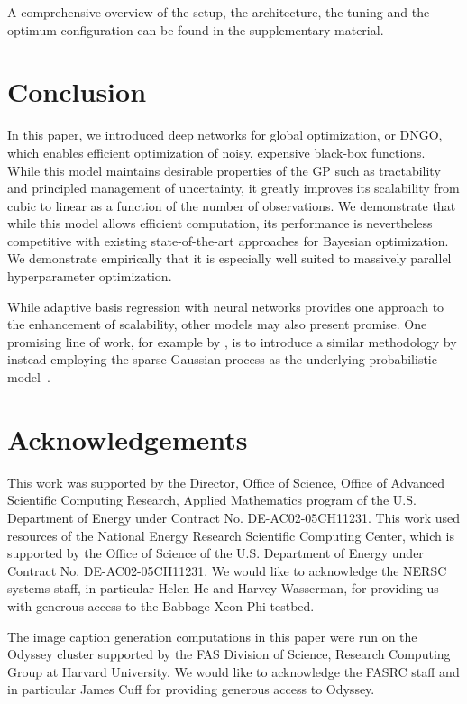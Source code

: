 \documentclass{article}
\begin{document}
A comprehensive overview of the setup, the architecture, the tuning and the optimum configuration can be found in the supplementary material.

\section{Conclusion}
In this paper, we introduced deep networks for global optimization, or DNGO, which enables efficient optimization of noisy, expensive black-box functions. While this model maintains desirable properties of the GP such as tractability and principled management of uncertainty, it greatly improves its scalability from cubic to linear as a function of the number of observations. We demonstrate that while this model allows efficient computation, its performance is nevertheless competitive with existing state-of-the-art approaches for Bayesian optimization.  We demonstrate empirically that it is especially well suited to massively parallel hyperparameter optimization.

While adaptive basis regression with neural networks provides one approach to the enhancement of scalability, other models may also present promise. One promising line of work, for example by \citet{nicksonautomated}, is to introduce a similar methodology by instead employing the sparse Gaussian process as the underlying probabilistic model~\cite{snelson2005sparse,titsias2009variational,hensman2013bigdatagp}.

\section{Acknowledgements}\small
This work was supported by the Director, Office of Science, Office of Advanced Scientific Computing Research, Applied Mathematics program of the U.S. Department of Energy under Contract No. DE-AC02-05CH11231. This work used resources of the National Energy Research Scientific Computing Center, which is supported by the Office of Science of the U.S. Department of Energy under Contract No. DE-AC02-05CH11231. We would like to acknowledge the NERSC systems staff, in particular Helen He and Harvey Wasserman, for providing us with generous access to the Babbage Xeon Phi testbed.

The image caption generation computations in this paper were run on the Odyssey cluster supported by the FAS Division of Science, Research Computing Group at Harvard University.  We would like to acknowledge the FASRC staff and in particular James Cuff for providing generous access to Odyssey.
\end{document}

